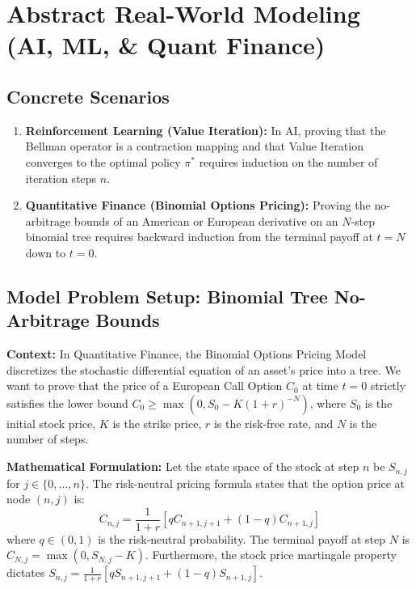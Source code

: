 \documentclass[11pt, a4paper]{article}
\theoremstyle{definition}
\theoremstyle{remark}
\begin{document}
\section{Abstract Real-World Modeling (AI, ML, \& Quant Finance)}

\subsection{Concrete Scenarios}
\begin{enumerate}
    \item \textbf{Reinforcement Learning (Value Iteration):} In AI, proving that the Bellman operator is a contraction mapping and that Value Iteration converges to the optimal policy $\pi^*$ requires induction on the number of iteration steps $n$.
    \item \textbf{Quantitative Finance (Binomial Options Pricing):} Proving the no-arbitrage bounds of an American or European derivative on an $N$-step binomial tree requires backward induction from the terminal payoff at $t=N$ down to $t=0$.
\end{enumerate}

\subsection{Model Problem Setup: Binomial Tree No-Arbitrage Bounds}
\textbf{Context:} In Quantitative Finance, the Binomial Options Pricing Model discretizes the stochastic differential equation of an asset's price into a tree. We want to prove that the price of a European Call Option $C_0$ at time $t=0$ strictly satisfies the lower bound $C_0 \ge \max(0, S_0 - K(1+r)^{-N})$, where $S_0$ is the initial stock price, $K$ is the strike price, $r$ is the risk-free rate, and $N$ is the number of steps.

\textbf{Mathematical Formulation:}
Let the state space of the stock at step $n$ be $S_{n, j}$ for $j \in \{0, \dots, n\}$. 
The risk-neutral pricing formula states that the option price at node $(n, j)$ is:
\[ C_{n, j} = \frac{1}{1+r} \left[ q C_{n+1, j+1} + (1-q) C_{n+1, j} \right] \]
where $q \in (0,1)$ is the risk-neutral probability. The terminal payoff at step $N$ is $C_{N, j} = \max(0, S_{N, j} - K)$. Furthermore, the stock price martingale property dictates $S_{n, j} = \frac{1}{1+r} [q S_{n+1, j+1} + (1-q) S_{n+1, j}]$.
\end{document}

